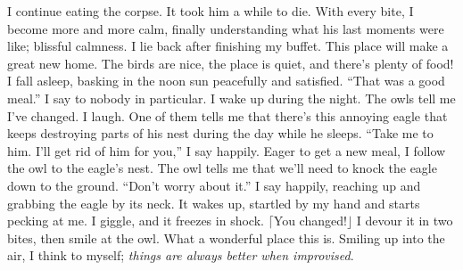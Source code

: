 \documentclass[openany, 12pt]{book}
\newcommand\bird[1]{$\lceil$#1$\rfloor$\tab}
\newcommand\tab[1][1cm]{\hspace*{#1}}
\begin{document}
\newline
\newline
\tab
I continue eating the corpse. It took him a while to die. With every bite, I become more and more calm, finally understanding what his last moments were like; blissful calmness. I lie back after finishing my buffet. This place will make a great new home. The birds are nice, the place is quiet, and there’s plenty of food! I fall asleep, basking in the noon sun peacefully and satisfied. ``That was a good meal.'' I say to nobody in particular.
\newline
\tab
I wake up during the night. The owls tell me I’ve changed. I laugh. One of them tells me that there’s this annoying eagle that keeps destroying parts of his nest during the day while he sleeps. ``Take me to him. I’ll get rid of him for you,'' I say happily. Eager to get a new meal, I follow the owl to the eagle’s nest. The owl tells me that we’ll need to knock the eagle down to the ground. ``Don’t worry about it.'' I say happily, reaching up and grabbing the eagle by its neck. It wakes up, startled by my hand and starts pecking at me. I giggle, and it freezes in shock.
\newline
\bird{You changed!}
\newline
\tab
I devour it in two bites, then smile at the owl. What a wonderful place this is. Smiling up into the air, I think to myself; \textit{things are always better when improvised}.
\end{document}
